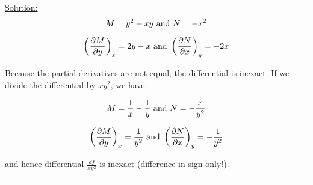 \noindent
\underline{Solution:}\\

$$M = y^2 -xy\textnormal{ and }N = -x^2$$

$$\left(\frac{\partial M}{\partial y}\right)_x = 2y - x\textnormal{ and }\left(\frac{\partial N}{\partial x}\right)_y = -2x$$

Because the partial derivatives are not equal, the differential is inexact. If we divide the differential by $xy^2$, we have:

$$M = \frac{1}{x} - \frac{1}{y}\textnormal{ and }N = -\frac{x}{y^2}$$

$$\left(\frac{\partial M}{\partial y}\right)_x = \frac{1}{y^2}\textnormal{ and }\left(\frac{\partial N}{\partial x}\right)_y = -\frac{1}{y^2}$$

and hence differential $\frac{df}{xy^2}$ is inexact (difference in sign only!).

\hrule\vspace{0.5cm}
